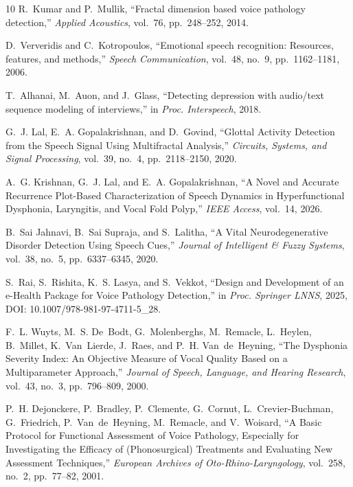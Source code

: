 \documentclass[conference]{IEEEtran}
\begin{document}
\begin{thebibliography}{10}
  R.~Kumar and P.~Mullik, 
  ``Fractal dimension based voice pathology detection,'' 
  \emph{Applied Acoustics}, vol.~76, pp.~248--252, 2014.

  D.~Ververidis and C.~Kotropoulos, 
  ``Emotional speech recognition: Resources, features, and methods,'' 
  \emph{Speech Communication}, 
  vol.~48, no.~9, pp.~1162--1181, 2006.

  T.~Alhanai, M.~Auon, and J.~Glass,
  ``Detecting depression with audio/text sequence modeling of interviews,''
  in \emph{Proc. Interspeech}, 2018.

G.~J. Lal, E.~A. Gopalakrishnan, and D.~Govind,
``Glottal Activity Detection from the Speech Signal Using Multifractal Analysis,''
\emph{Circuits, Systems, and Signal Processing},
vol.~39, no.~4, pp.~2118--2150, 2020.

A.~G. Krishnan, G.~J. Lal, and E.~A. Gopalakrishnan,
``A Novel and Accurate Recurrence Plot-Based Characterization of Speech Dynamics
in Hyperfunctional Dysphonia, Laryngitis, and Vocal Fold Polyp,''
\emph{IEEE Access},
vol.~14, 2026.

B.~Sai Jahnavi, B.~Sai Supraja, and S.~Lalitha,
``A Vital Neurodegenerative Disorder Detection Using Speech Cues,''
\emph{Journal of Intelligent \& Fuzzy Systems},
vol.~38, no.~5, pp.~6337--6345, 2020.

S.~Rai, S.~Rishita, K.~S. Lasya, and S.~Vekkot,
``Design and Development of an e-Health Package for Voice Pathology Detection,''
in \emph{Proc. Springer LNNS}, 2025,
DOI: 10.1007/978-981-97-4711-5\_28.

  F.~L. Wuyts, M.~S. De~Bodt, G.~Molenberghs, M.~Remacle,
  L.~Heylen, B.~Millet, K.~Van~Lierde, J.~Raes, and P.~H. Van~de~Heyning,
  ``The Dysphonia Severity Index: An Objective Measure of Vocal Quality
  Based on a Multiparameter Approach,''
  \emph{Journal of Speech, Language, and Hearing Research},
  vol.~43, no.~3, pp.~796--809, 2000.

  P.~H. Dejonckere, P.~Bradley, P.~Clemente, G.~Cornut,
  L.~Crevier-Buchman, G.~Friedrich, P.~Van~de~Heyning,
  M.~Remacle, and V.~Woisard,
  ``A Basic Protocol for Functional Assessment of Voice Pathology,
  Especially for Investigating the Efficacy of (Phonosurgical) Treatments
  and Evaluating New Assessment Techniques,''
  \emph{European Archives of Oto-Rhino-Laryngology},
  vol.~258, no.~2, pp.~77--82, 2001.


\end{thebibliography}
\end{document}
